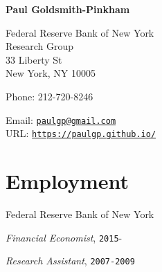 \documentclass[letterpaper]{article}
\renewenvironment{itemize}{
  \begin{list}{}
    { \setlength{\itemsep}{5pt}
      \setlength{\parsep}{0pt}
      \setlength{\topsep}{0pt}
      \setlength{\leftmargin}{0em} } }{
  \end{list}}
\begin{document}
{\huge\bf  Paul Goldsmith-Pinkham}

\bigskip

Federal Reserve Bank of New York \\
Research Group \\
33 Liberty St \\
New York, NY 10005

\medskip

Phone: 212-720-8246

\medskip

Email: \href{mailto:paulgp@gmail.com}{\tt paulgp@gmail.com} \\
URL: \href{http://https://paulgp.github.io//}{\tt https://paulgp.github.io/} 

\section*{Employment}
\begin{itemize}
\item Federal Reserve Bank of New York
  \begin{itemize}
  \item \qquad \textit{Financial Economist}, \texttt{2015}-
  \item \qquad \textit{Research Assistant}, \texttt{2007-2009}
  \end{itemize}
\end{itemize}
\end{document}
